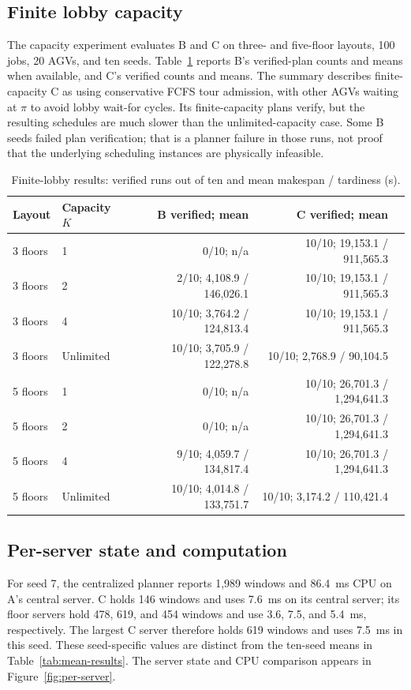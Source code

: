 \subsection{Finite lobby capacity}

The capacity experiment evaluates B and C on three- and five-floor layouts,
100 jobs, 20 AGVs, and ten seeds. Table~\ref{tab:lobby-cap} reports B's
verified-plan counts and means when available, and C's verified counts and
means. The summary describes finite-capacity C as using conservative FCFS
tour admission, with other AGVs waiting at $\pi$ to avoid lobby wait-for
cycles. Its finite-capacity plans verify, but the resulting schedules are
much slower than the unlimited-capacity case. Some B seeds failed plan
verification; that is a planner failure in those runs, not proof that the
underlying scheduling instances are physically infeasible.

\begin{table}[htbp]
\centering
\scriptsize
\caption{Finite-lobby results: verified runs out of ten and mean makespan / tardiness (s).}
\label{tab:lobby-cap}
\begin{tabular}{llrrr}
\toprule
Layout & Capacity $K$ & B verified; mean & C verified; mean \\
\midrule
3 floors & 1 & 0/10; n/a & 10/10; 19,153.1 / 911,565.3 \\
3 floors & 2 & 2/10; 4,108.9 / 146,026.1 & 10/10; 19,153.1 / 911,565.3 \\
3 floors & 4 & 10/10; 3,764.2 / 124,813.4 & 10/10; 19,153.1 / 911,565.3 \\
3 floors & Unlimited & 10/10; 3,705.9 / 122,278.8 & 10/10; 2,768.9 / 90,104.5 \\
5 floors & 1 & 0/10; n/a & 10/10; 26,701.3 / 1,294,641.3 \\
5 floors & 2 & 0/10; n/a & 10/10; 26,701.3 / 1,294,641.3 \\
5 floors & 4 & 9/10; 4,059.7 / 134,817.4 & 10/10; 26,701.3 / 1,294,641.3 \\
5 floors & Unlimited & 10/10; 4,014.8 / 133,751.7 & 10/10; 3,174.2 / 110,421.4 \\
\bottomrule
\end{tabular}
\end{table}

\subsection{Per-server state and computation}

For seed 7, the centralized planner reports 1,989 windows and
86.4~ms CPU on A's central server. C holds 146 windows and uses 7.6~ms on
its central server; its floor servers hold 478, 619, and 454 windows and use
3.6, 7.5, and 5.4~ms, respectively. The largest C server therefore holds
619 windows and uses 7.5~ms in this seed. These seed-specific values are
distinct from the ten-seed means in Table~\ref{tab:mean-results}. The server
state and CPU comparison appears in Figure~\ref{fig:per-server}.

